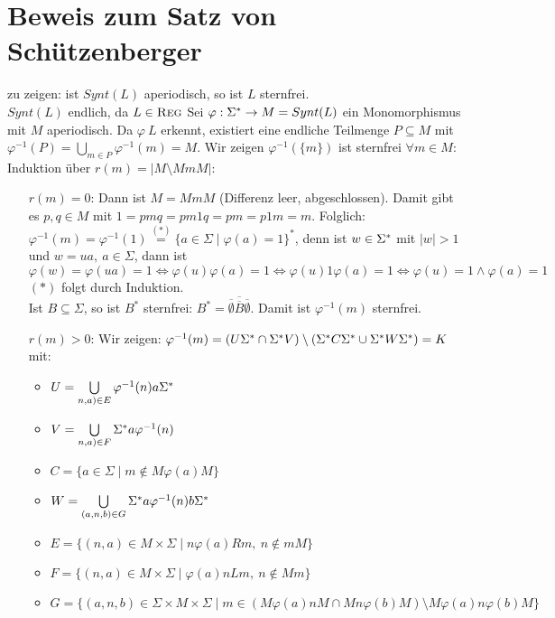 \section{Beweis zum Satz von Schützenberger}
    zu zeigen: ist $Synt(L)$ aperiodisch, so ist $L$ sternfrei.\\
    $Synt(L)$ endlich, da $L\in \textsc{Reg}$
    Sei $\varphi:\Sigma^*\rightarrow M=Synt(L)$ ein Monomorphismus mit $M$ aperiodisch. Da $\varphi\ L$ erkennt, existiert eine endliche Teilmenge $P\subseteq M$ mit $\varphi^{-1}(P)=\bigcup\limits_{m\in P}\varphi^{-1}(m)=M$. Wir zeigen $\varphi^{-1}(\{m\})$ ist sternfrei $\forall m\in M$:\\
    Induktion über $r(m)=|M\setminus MmM|$:
    \begin{itemize}
        \item[$r(m)=0$:] Dann ist $M=MmM$ (Differenz leer, abgeschlossen). Damit gibt es $p,q\in M$ mit $1=pmq=pm1q=pm=p1m=m$. Folglich: $\varphi^{-1}(m)=\varphi^{-1}(1)\overset{(*)}{=}\{a\in\Sigma\mid\varphi(a)=1\}^*$, denn ist $w\in \Sigma^*$ mit $|w|>1$ und $w=ua,\ a\in \Sigma$, dann ist $$\varphi(w)=\varphi(ua)=1\Leftrightarrow \varphi(u)\varphi(a)=1\Leftrightarrow \varphi(u)1\varphi(a)=1\Leftrightarrow \varphi(u)=1\wedge \varphi(a)=1$$
        $(*)$ folgt durch Induktion.\\
        Ist $B\subseteq \Sigma$, so ist $B^*$ sternfrei: $B^*=\overline{\overline{\emptyset}\overline{B}\overline{\emptyset}}$. Damit ist $\varphi^{-1}(m)$ sternfrei.
        \item[$r(m)>0$:] Wir zeigen: $\varphi^{-1}(m)=(U\Sigma^*\cap \Sigma^* V)\setminus(\Sigma^* C\Sigma^*\cup \Sigma^* W\Sigma^*)=K$ mit:
        \begin{itemize}
            \item $U=\bigcup\limits_{n,a)\in E} \varphi^{-1}(n)a\Sigma^*$
            \item $V=\bigcup\limits_{n,a)\in F} \Sigma^* a\varphi^{-1}(n)$
            \item $C=\{a\in\Sigma\mid m\not\in M\varphi(a)M\}$
            \item $W=\bigcup\limits_{(a,n,b)\in G}\Sigma^* a\varphi^{-1}(n)b\Sigma^*$
            \item $E=\{(n,a)\in M\times \Sigma\mid n\varphi(a)Rm,\ n\not\in mM\}$
            \item $F=\{(n,a)\in M\times \Sigma\mid \varphi(a)nLm,\ n\not\in Mm\}$
            \item $G=\{(a,n,b)\in \Sigma\times M\times \Sigma\mid m\in \left(M\varphi(a)nM\cap Mn\varphi(b)M\right)\setminus M\varphi(a)n\varphi(b)M\}$

\end{itemize}
\end{itemize}
